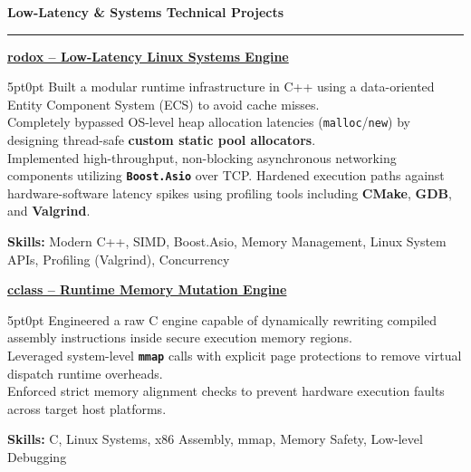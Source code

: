 \documentclass[9pt]{extarticle}
\begin{document}
\par\vspace{5pt}

{\large\bfseries Low-Latency \& Systems Technical Projects}
\par\vspace{-8pt}
\rule{\linewidth}{0.4pt}
\par\vspace{5pt}

\underline{\bfseries rodox -- Low-Latency Linux Systems Engine} %
\par
\begin{adjustwidth}{5pt}{0pt}
    Built a modular runtime infrastructure in C++ using a data-oriented Entity Component System (ECS) to avoid cache misses. \\
    Completely bypassed OS-level heap allocation latencies (\texttt{malloc}/\texttt{new}) by designing thread-safe {\bfseries custom static pool allocators}. \\
    Implemented high-throughput, non-blocking asynchronous networking components utilizing {\bfseries \texttt{Boost.Asio}} over TCP. %
    Hardened execution paths against hardware-software latency spikes using profiling tools including {\bfseries CMake}, {\bfseries GDB}, and {\bfseries Valgrind}.
\end{adjustwidth}
\par
{\bfseries Skills:} Modern C++, SIMD, Boost.Asio, Memory Management, Linux System APIs, Profiling (Valgrind), Concurrency %

\par\vspace{8pt}

\underline{\bfseries cclass -- Runtime Memory Mutation Engine} %
\par
\begin{adjustwidth}{5pt}{0pt}
    Engineered a raw C engine capable of dynamically rewriting compiled assembly instructions inside secure execution memory regions. \\
    Leveraged system-level {\bfseries \texttt{mmap}} calls with explicit page protections to remove virtual dispatch runtime overheads. \\
    Enforced strict memory alignment checks to prevent hardware execution faults across target host platforms.
\end{adjustwidth}
\par
{\bfseries Skills:} C, Linux Systems, x86 Assembly, mmap, Memory Safety, Low-level Debugging
\end{document}
